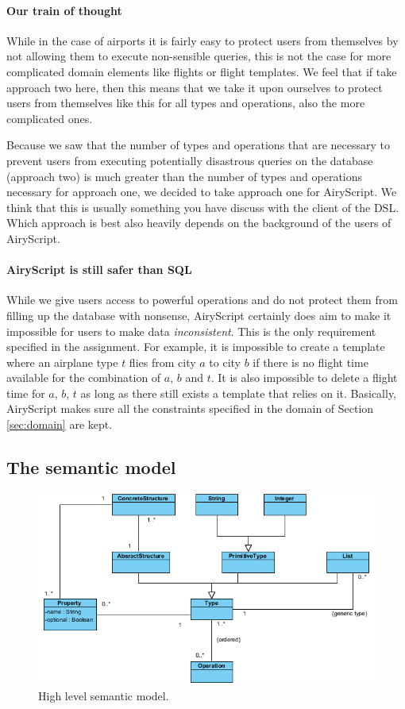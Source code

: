 \paragraph{Our train of thought}
While in the case of airports it is fairly easy to protect users from themselves
by not allowing them to execute non-sensible queries, this is not the case for
more complicated domain elements like flights or flight templates. We feel that
if take approach two here, then this means that we take it upon ourselves to
protect users from themselves like this for all types and operations, also the
more complicated ones.

Because we saw that the number of types and operations that are necessary to
prevent users from executing potentially disastrous queries on the database
(approach two) is much greater than the number of types and operations necessary
for approach one, we decided to take approach one for AiryScript. We think that
this is usually something you have discuss with the client of the DSL. Which
approach is best also heavily depends on the background of the users of
AiryScript.

\paragraph{AiryScript is still safer than SQL}
While we give users access to powerful operations and do not protect them from
filling up the database with nonsense, AiryScript certainly does aim to make it
impossible for users to make data \emph{inconsistent}. This is the only
requirement specified in the assignment. For example, it is impossible to create
a template where an airplane type $t$ flies from city $a$ to city $b$ if there
is no flight time available for the combination of $a$, $b$ and $t$. It is also
impossible to delete a flight time for $a$, $b$, $t$ as long as there still
exists a template that relies on it. Basically, AiryScript makes sure all the
constraints specified in the domain of Section \ref{sec:domain} are kept.


\subsection{The semantic model}
\label{subs:semantic}

\begin{figure}
\includegraphics[width=\textwidth]{img/semanticModel.png}
\caption{High level semantic model.}
\label{fig:semantic-model}
\end{figure}

